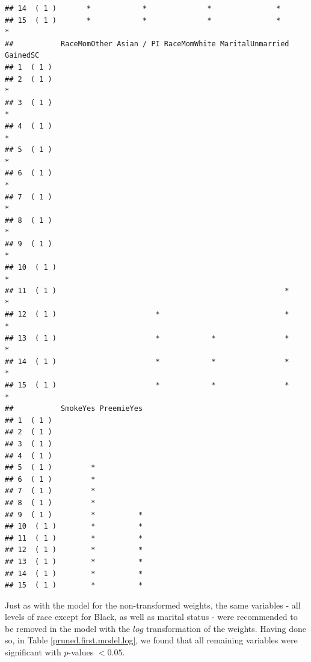 \documentclass{article}\usepackage[]{graphicx}\usepackage[]{xcolor}
\makeatletter
\newenvironment{kframe}{%
 \def\at@end@of@kframe{}%
 \ifinner\ifhmode%
  \def\at@end@of@kframe{\end{minipage}}%
  \begin{minipage}{\columnwidth}%
 \fi\fi%
 \def\FrameCommand##1{\hskip\@totalleftmargin \hskip-\fboxsep
 \colorbox{shadecolor}{##1}\hskip-\fboxsep
     \hskip-\linewidth \hskip-\@totalleftmargin \hskip\columnwidth}%
 \MakeFramed {\advance\hsize-\width
   \@totalleftmargin\z@ \linewidth\hsize
   \@setminipage}}%
 {\par\unskip\endMakeFramed%
 \at@end@of@kframe}
\newenvironment{knitrout}{}{} %
\makeatother
\begin{document}
\begin{knitrout}
\begin{kframe}
\begin{verbatim}
## 14  ( 1 )       *            *              *               *                
## 15  ( 1 )       *            *              *               *               *
##           RaceMomOther Asian / PI RaceMomWhite MaritalUnmarried GainedSC
## 1  ( 1 )                                                                
## 2  ( 1 )                                                               *
## 3  ( 1 )                                                               *
## 4  ( 1 )                                                               *
## 5  ( 1 )                                                               *
## 6  ( 1 )                                                               *
## 7  ( 1 )                                                               *
## 8  ( 1 )                                                               *
## 9  ( 1 )                                                               *
## 10  ( 1 )                                                              *
## 11  ( 1 )                                                     *        *
## 12  ( 1 )                       *                             *        *
## 13  ( 1 )                       *            *                *        *
## 14  ( 1 )                       *            *                *        *
## 15  ( 1 )                       *            *                *        *
##           SmokeYes PreemieYes
## 1  ( 1 )                     
## 2  ( 1 )                     
## 3  ( 1 )                     
## 4  ( 1 )                     
## 5  ( 1 )         *           
## 6  ( 1 )         *           
## 7  ( 1 )         *           
## 8  ( 1 )         *           
## 9  ( 1 )         *          *
## 10  ( 1 )        *          *
## 11  ( 1 )        *          *
## 12  ( 1 )        *          *
## 13  ( 1 )        *          *
## 14  ( 1 )        *          *
## 15  ( 1 )        *          *
\end{verbatim}
\end{kframe}
\end{knitrout}

Just as with the model for the non-transformed weights, the same variables - all levels of race except for Black, as well as marital status - were recommended to be removed in the model with the $log$ transformation of the weights. Having done so, in Table \ref{pruned.first.model.log}, we found that all remaining variables were significant with $p$-values $<0.05$. 
\end{document}
